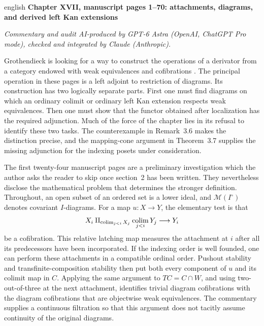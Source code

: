 \begin{otherlanguage*}{english}
\noindent\textbf{Chapter XVII, manuscript pages 1--70: attachments, diagrams, and derived left Kan extensions}

\medskip
\noindent\emph{Commentary and audit AI-produced by GPT-6 Astra (OpenAI, ChatGPT Pro mode), checked and integrated by Claude (Anthropic).}

\medskip
Grothendieck is looking for a way to construct the operations of a derivator from a category endowed with weak equivalences and cofibrations \citep{Grothendieck1990XVII}. The principal operation in these pages is a left adjoint to restriction of diagrams. Its construction has two logically separate parts. First one must find diagrams on which an ordinary colimit or ordinary left Kan extension respects weak equivalences. Then one must show that the functor obtained after localization has the required adjunction. Much of the force of the chapter lies in its refusal to identify these two tasks. The counterexample in Remark~3.6 makes the distinction precise, and the mapping-cone argument in Theorem~3.7 supplies the missing adjunction for the indexing posets under consideration.

The first twenty-four manuscript pages are a preliminary investigation which the author asks the reader to skip once section~2 has been written. They nevertheless disclose the mathematical problem that determines the stronger definition. Throughout, an open subset of an ordered set is a lower ideal, and $\mathcal M(I^\circ)$ denotes covariant $I$-diagrams. For a map $u:X\to Y$, the elementary test is that
\[
 X_i\amalg_{\mathop{\rm colim}_{j<i}X_j}
       \mathop{\rm colim}_{j<i}Y_j\longrightarrow Y_i
\]
be a cofibration. This relative latching map measures the attachment at $i$ after all its predecessors have been incorporated. If the indexing order is well founded, one can perform these attachments in a compatible ordinal order. Pushout stability and transfinite-composition stability then put both every component of $u$ and its colimit map in $C$. Applying the same argument to $TC=C\cap W$, and using two-out-of-three at the next attachment, identifies trivial diagram cofibrations with the diagram cofibrations that are objectwise weak equivalences. The commentary supplies a continuous filtration so that this argument does not tacitly assume continuity of the original diagrams.


\end{otherlanguage*}
